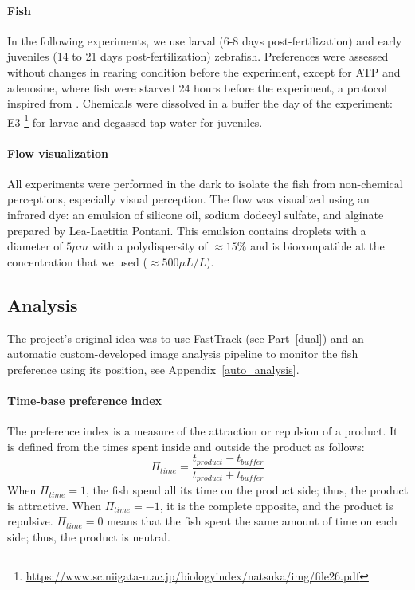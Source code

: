   \paragraph{Fish} In the following experiments, we use larval (6-8 days post-fertilization) and early juveniles (14 to 21 days post-fertilization) zebrafish. Preferences were assessed without changes in rearing condition before the experiment, except for ATP and adenosine, where fish were starved 24 hours before the experiment, a protocol inspired from \cite{wakisaka2017adenosine}. Chemicals were dissolved in a buffer the day of the experiment: E3 \footnote{\url{https://www.sc.niigata-u.ac.jp/biologyindex/natsuka/img/file26.pdf}} for larvae and degassed tap water for juveniles.

  \paragraph{Flow visualization} All experiments were performed in the dark to isolate the fish from non-chemical perceptions, especially visual perception. The flow was visualized using an infrared dye: an emulsion of silicone oil, sodium dodecyl sulfate, and alginate prepared by Lea-Laetitia Pontani. This emulsion contains droplets with a diameter of $5 \mu m$ with a polydispersity of $\approx 15 \%$ and is biocompatible \cite{ali2011large} at the concentration that we used ($\approx 500 \mu L/L$).

  \subsection{Analysis}
  The project's original idea was to use FastTrack (see Part~\ref{dual}) and an automatic custom-developed image analysis pipeline to monitor the fish preference using its position, see Appendix~\ref{auto_analysis}.

  \paragraph{Time-base preference index} The preference index is a measure of the attraction or repulsion of a product. It is defined from the times spent inside and outside the product as follows:
  \begin{equation}
    \Pi_{time}=\frac{t_{product}-t_{buffer}}{t_{product}+t_{buffer}}
  \end{equation}
  \noindent When $\Pi_{time} = 1$, the fish spend all its time on the product side; thus, the product is attractive. When $\Pi_{time} = -1$, it is the complete opposite, and the product is repulsive. $\Pi_{time} = 0$ means that the fish spent the same amount of time on each side; thus, the product is neutral.

